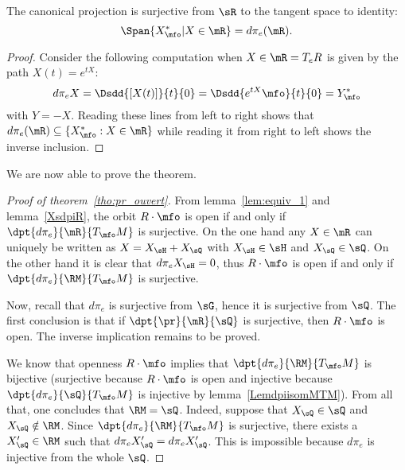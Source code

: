\begin{lemma}
	The canonical projection is surjective from $\sR$ to the tangent space to identity:
	\begin{equation}\label{eq:equiv_2}
		\Span\{X^*_{\mfo}|X\in\mR\}=d\pi_e(\mR).
	\end{equation}

	\label{XsdpiR}

\end{lemma}

\begin{proof}
	Consider the following computation when $X\in\mR=T_eR$ is given by the path $X(t)=e^{tX}$:
	\begin{equation}
		d\pi_e X=\Dsdd{[X(t)]}{t}{0}
		=\Dsdd{e^{tX}\mfo}{t}{0}
		=Y^*_{\mfo}
	\end{equation}
	with $Y=-X$. Reading these lines from left to right shows that $d\pi_e(\mR)\subseteq\{X^*_{\mfo}:X\in\mR\}$ while reading it from right to left shows the inverse inclusion.
\end{proof}


We are now able to prove the theorem.

\begin{proof}[Proof of theorem~\ref{tho:pr_ouvert}]
	From lemma~\ref{lem:equiv_1} and lemma~\ref{XsdpiR}, the orbit $R\cdot\mfo$ is open if and only if $\dpt{d\pi_e}{\mR}{T_{\mfo}M}$ is surjective. On the one hand any $X\in\mR$ can uniquely be written as $X=X_{\sH}+X_{\sQ}$ with $X_{\sH}\in\sH$ and $X_{\sQ}\in\sQ$. On the other hand it is clear that $d\pi_e X_{\sH}=0$, thus $R\cdot\mfo$ is open if and only if $\dpt{d\pi_e}{\RM}{T_{\mfo}M}$ is surjective.

	Now, recall that $d\pi_e$ is surjective from $\sG$, hence it is surjective from $\sQ$. The first conclusion is that if $\dpt{\pr}{\mR}{\sQ}$ is surjective, then $R\cdot\mfo$ is open. The inverse implication remains to be proved.

	We know that openness $R\cdot\mfo$ implies that $\dpt{d\pi_e}{\RM}{T_{\mfo}M}$ is bijective (surjective because $R\cdot\mfo$ is open and injective because $\dpt{d\pi_e}{\sQ}{T_{\mfo}M}$ is injective by lemma~\ref{LemdpiisomMTM}). From all that, one concludes that $\RM=\sQ$. Indeed,  suppose that $X_{\sQ}\in\sQ$ and $X_{\sQ}\notin\RM$. Since $\dpt{d\pi_e}{\RM}{T_{\mfo}M}$ is surjective, there exists a $X_{\sQ}'\in\RM$ such that $d\pi_eX_{\sQ}'=d\pi_eX_{\sQ}'$. This is impossible because $d\pi_e$ is injective from the whole $\sQ$.

\end{proof}
